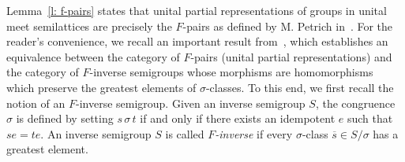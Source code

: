 \documentclass{amsart}
\newcommand{\0}{{\vartheta}}
\newcommand{\m}{{}^{-1}}
\theoremstyle{definition}
\theoremstyle{remark}
\numberwithin{equation}{section}
\newtheorem*{Theorem A}{\textbf{Theorem A}}
\newtheorem*{Corollary E}{\textbf{Corollary E}}
\newtheorem*{Corollary F}{\textbf{Corollary F}}
\newtheorem*{Theorem B}{\textbf{Theorem B}}
\newtheorem*{Theorem C}{\textbf{Theorem C}}
\newtheorem*{Theorem D}{\textbf{Theorem B}}
\newtheorem*{p a}{\textbf{Proof of  Theorem A}}
\newtheorem*{p b}{\textbf{Proof of Theorem B}}
\newtheorem*{p c}{\textbf{Proof of  Theorem C}}
\newtheorem*{p d}{\textbf{Proof of  Theorem D}}
\begin{document}

  Lemma~\ref{l: f-pairs} states that unital partial representations of groups in unital meet semilattices are precisely the $F$-pairs as defined by M. Petrich in~\cite[Section VII.6]{Petrich1984}.  For the reader’s convenience, we recall an important result from~\cite{Petrich1984}, which establishes an equivalence between the category of $F$-pairs (unital partial representations) and the category of $F$-inverse semigroups whose morphisms are homomorphisms which preserve the greatest elements of $\sigma$-classes. To this end, we first recall the notion of an $F$-inverse semigroup.  Given an inverse semigroup $S$,  the congruence $\sigma$ is defined by setting $s \,\sigma\, t$ if and only if there exists an idempotent $e$ such that $se = te$. An inverse semigroup $S$ is called \emph{$F$-inverse} if every $\sigma$-class $\overline{s} \in S/\sigma$ has a greatest element.  
\end{document}
